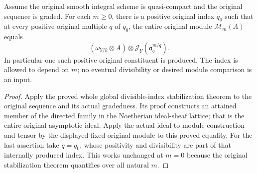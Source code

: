 \begin{lemma}
\label{lem:c0n-asymptotic-adjoint-attainment}
\leanok
{}
Assume the original smooth integral scheme is quasi-compact and the
original sequence is graded. For each $m\geq0$, there is a positive
original index $q_0$ such that at every positive original multiple $q$
of $q_0$, the entire original module $\mathcal M_m(A)$ equals
\[
 (\omega_{Y/k}\otimes A)\otimes
 \mathcal J_Y(\mathfrak a_q^{m/q}).
\]
In particular one such positive original constituent is produced. The
index is allowed to depend on $m$; no eventual divisibility or desired
module comparison is an input.
\end{lemma}
\begin{proof}
Apply the proved whole global divisible-index stabilization theorem to
the original sequence and its actual gradedness. Its proof constructs
an attained member of the directed family in the Noetherian ideal-sheaf
lattice; that is the entire original asymptotic ideal. Apply the actual
ideal-to-module construction and tensor by the displayed fixed original
module to this proved equality. For the last assertion take $q=q_0$,
whose positivity and divisibility are part of that internally produced
index. This works unchanged at $m=0$ because the original stabilization
theorem quantifies over all natural $m$.
\end{proof}

